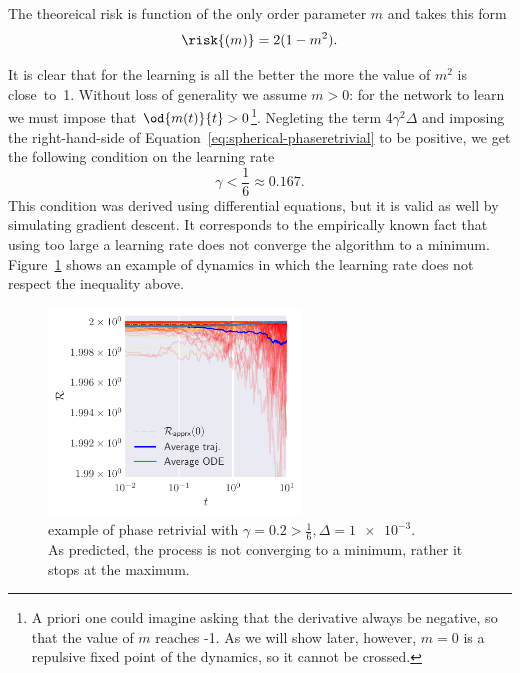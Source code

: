 The theoreical risk is function of the only order parameter \(m\) and takes this form
\[
  \risk{(m)} = 2(1-m^2).
\]

It is clear that for the learning is all the better the more the value of \(m^2\) is close~to~1.
Without loss of generality we assume \(m>0\): for the network to learn we must impose that \(\od{m{(t)}}{t}>0\)\footnote{
  A priori one could imagine asking that the derivative always be negative, so that the value of \(m\) reaches -1.
  As we will show later, however, \(m=0\) is a repulsive fixed point of the dynamics, so it cannot be crossed.
}.
Negleting the term \(4\gamma^2\Delta\) and imposing the right-hand-side of Equation~\eqref{eq:spherical-phaseretrivial} to be positive,
we get the following condition on the learning rate
\[\gamma<\frac16 \approx \num{0.167}.\]
This condition was derived using differential equations, but it is valid as well by simulating gradient descent.
It corresponds to the empirically known fact that using too large a learning rate does not converge the algorithm to a minimum.
Figure~\ref{fig:example-spherical-not-converging} shows an example of dynamics in which the learning rate does not respect the inequality above.
\begin{figure}
  \centering
  \includegraphics[width=0.6\textwidth]{figures/spherical/not-converging-phase-retrivial.pdf}
  \caption{
    example of phase retrivial with \(\gamma=0.2>\frac16, \Delta=\num{1e-3}\).\\
    As predicted, the process is not converging to a minimum, rather it stops at the maximum.
  }
  \label{fig:example-spherical-not-converging}
\end{figure}


